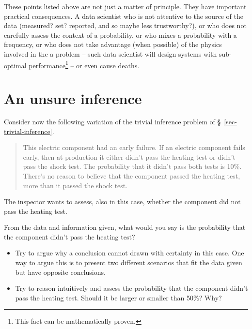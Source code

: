 \documentclass[
  a4paper,
  DIV=11,
  numbers=noendperiod,
  oneside]{scrreprt}
\providecommand{\tightlist}{%
  \setlength{\itemsep}{0pt}\setlength{\parskip}{0pt}}\usepackage{longtable,booktabs,array}
\begin{document}
\hfill\break

These points listed above are not just a matter of principle. They have
important practical consequences. A data scientist who is not attentive
to the source of the data (measured? set? reported, and so maybe less
trustworthy?), or who does not carefully assess the context of a
probability, or who mixes a probability with a frequency, or who does
not take advantage (when possible) of the physics involved in the a
problem -- such data scientist will design systems with sub-optimal
performance\footnote{This fact can be mathematically proven.} -- or even
cause deaths.

\hypertarget{an-unsure-inference}{%
\section{An unsure inference}\label{an-unsure-inference}}

Consider now the following variation of the trivial inference problem of
§~\ref{sec-trivial-inference}.

\begin{quote}
This electric component had an early failure. If an electric component
fails early, then at production it either didn't pass the heating test
or didn't pass the shock test. The probability that it didn't pass both
tests is 10\%. There's no reason to believe that the component passed
the heating test, more than it passed the shock test.
\end{quote}

The inspector wants to assess, also in this case, whether the component
did not pass the heating test.

From the data and information given, what would you say is the
probability that the component didn't pass the heating test?

\begin{tcolorbox}[enhanced jigsaw, colback=white, breakable, coltitle=black, bottomtitle=1mm, title={\faIcon{user-edit} Exercises}, leftrule=.75mm, opacitybacktitle=0.6, opacityback=0, colframe=quarto-callout-caution-color-frame, colbacktitle=quarto-callout-caution-color!10!white, rightrule=.15mm, arc=.35mm, titlerule=0mm, toprule=.15mm, left=2mm, toptitle=1mm, bottomrule=.15mm]

\begin{itemize}
\tightlist
\item
  Try to argue why a conclusion cannot drawn with certainty in this
  case. One way to argue this is to present two different scenarios that
  fit the data given but have opposite conclusions.
\item
  Try to reason intuitively and assess the probability that the
  component didn't pass the heating test. Should it be larger or smaller
  than 50\%? Why?
\end{itemize}

\end{tcolorbox}
\end{document}
